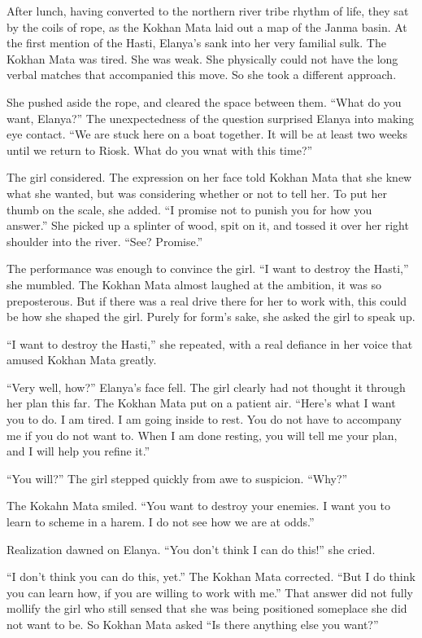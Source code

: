 \documentclass{article}
\begin{document}
	After lunch, having converted to the northern river tribe rhythm of life, they sat by the coils of rope, as the Kokhan Mata laid out a map of the Janma basin. At the first mention of the Hasti, Elanya’s sank into her very familial sulk. The Kokhan Mata was tired. She was weak. She physically could not have the long verbal matches that accompanied this move. So she took a different approach.
	
	She pushed aside the rope, and cleared the space between them. “What do you want, Elanya?” 
	The unexpectedness of the question surprised Elanya into making eye contact. “We are stuck here on a boat together. It will be at least two weeks until we return to Riosk. What do you wnat with this time?”
	
	The girl considered. The expression on her face told Kokhan Mata that she knew what she wanted, but was considering whether or not to tell her. To put her thumb on the scale, she added. “I promise not to punish you for how you answer.” She picked up a splinter of wood, spit on it, and tossed it over her right shoulder into the river. “See? Promise.”
	
	The performance was enough to convince the girl. “I want to destroy the Hasti,” she mumbled. The Kokhan Mata almost laughed at the ambition, it was so preposterous. But if there was a real drive there for her to work with, this could be how she shaped the girl. Purely for form’s sake, she asked the girl to speak up.
	
	“I want to destroy the Hasti,” she repeated, with a real defiance in her voice that amused Kokhan Mata greatly. 
	
	“Very well, how?” Elanya’s face fell. The girl clearly had not thought it through her plan this far. The Kokhan Mata put on a patient air. “Here’s what I want you to do. I am tired. I am going inside to rest. You do not have to accompany me if you do not want to. When I am done resting, you will tell me your plan, and I will help you refine it.”
	
	“You will?” The girl stepped quickly from awe to suspicion. “Why?”
	
	The Kokahn Mata smiled. “You want to destroy your enemies. I want you to learn to scheme in a harem. I do not see how we are at odds.” 
	
	Realization dawned on Elanya. “You don’t think I can do this!” she cried.
	
	“I don’t think you can do this, yet.” The Kokhan Mata corrected. “But I do think you can learn how, if you are willing to work with me.” That answer did not fully mollify the girl who still sensed that she was being positioned someplace she did not want to be. So Kokhan Mata asked “Is there anything else you want?”
	
\end{document}
